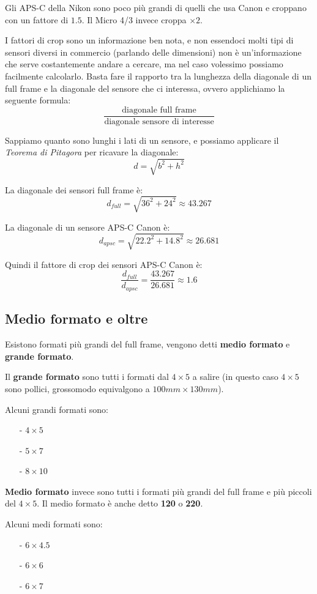 Gli APS-C della Nikon sono poco più grandi di quelli che usa Canon e croppano con un fattore di $1.5$. Il Micro 4/3 invece croppa $\times 2$.

I fattori di crop sono un informazione ben nota, e non essendoci molti tipi di sensori diversi in commercio (parlando delle dimensioni) non è un'informazione che serve costantemente andare a cercare, ma nel caso volessimo possiamo
facilmente calcolarlo. Basta fare il rapporto tra la lunghezza della diagonale di un full frame e la diagonale del sensore che ci interessa, ovvero applichiamo la seguente formula:
\[ \dfrac{\text{diagonale full frame}}{\text{diagonale sensore di interesse}} \]

Sappiamo quanto sono lunghi i lati di un sensore, e possiamo applicare il \textit{Teorema di Pitagora} per ricavare la diagonale:
\[ d = \sqrt{b^2 + h^2} \]

La diagonale dei sensori full frame è:
\[ d_{full} = \sqrt{36^2 + 24^2} \approx 43.267 \]

La diagonale di un sensore APS-C Canon è:
\[ d_{apsc} = \sqrt{22.2^2 + 14.8^2} \approx 26.681 \]

Quindi il fattore di crop dei sensori APS-C Canon è:
\[ \dfrac{d_{full}}{d_{apsc}} = \dfrac{43.267}{26.681} \approx 1.6 \]


\subsection{Medio formato e oltre} \label{subsec:sensorimedioformato}
Esistono formati più grandi del full frame, vengono detti \textbf{medio formato} e \textbf{grande formato}.

Il \textbf{grande formato} sono tutti i formati dal $4 \times 5$ a salire (in questo caso $4 \times 5$ sono pollici, grossomodo equivalgono a $100mm \times 130mm$).

Alcuni grandi formati sono:
\begin{itemize}
    \item[-] $4 \times 5$
    \item[-] $5 \times 7$
    \item[-] $8 \times 10$
\end{itemize}

\textbf{Medio formato} invece sono tutti i formati più grandi del full frame e più piccoli del $4 \times 5$. Il medio formato è anche detto \textbf{120} o \textbf{220}.

Alcuni medi formati sono:
\begin{itemize}
    \item[-] $6 \times 4.5$
    \item[-] $6 \times 6$
    \item[-] $6 \times 7$
\end{itemize}

